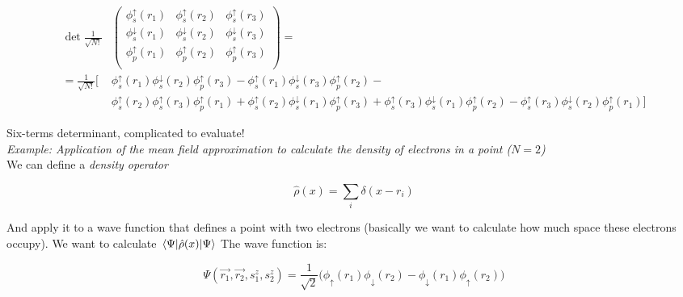 	\begin{align*}
		\det\frac{1}{\sqrt{N!}}&\begin{pmatrix}\phi_s^\uparrow(r_1)&\phi_s^\uparrow(r_2)&\phi_s^\uparrow(r_3)\\\phi_s^\downarrow(r_1)&\phi_s^\downarrow(r_2)&\phi_s^\downarrow(r_3)\\\phi_p^\uparrow(r_1)&\phi_p^\uparrow(r_2)&\phi_p^\uparrow(r_3)\\\end{pmatrix}=\\
		=\frac{1}{\sqrt{N!}}\big[&\phi_s^\uparrow(r_1)\phi_s^\downarrow(r_2)\phi_p^\uparrow(r_3)-\phi_s^\uparrow(r_1)\phi_s^\downarrow(r_3)\phi_p^\uparrow(r_2)-\\
		&\phi_s^\uparrow(r_2)\phi_s^\uparrow(r_3)\phi_p^\uparrow(r_1)+\phi_s^\uparrow(r_2)\phi_s^\downarrow(r_1)\phi_p^\uparrow(r_3)+\phi_s^\uparrow(r_3)\phi_s^\downarrow(r_1)\phi_p^\uparrow(r_2)-\phi_s^\uparrow(r_3)\phi_s^\downarrow(r_2)\phi_p^\uparrow(r_1)\big]
	\end{align*}

	Six-terms determinant, complicated to evaluate!\\
	\newline
	\textit{Example: Application of the mean field approximation to calculate the density of electrons in a point ($N=2$)}\\
	\newline
	We can define a \textit{density operator}

	$$\hat{\rho}(x)=\sum_i\delta(x-r_i)$$

	And apply it to a wave function that defines a point with two electrons (basically we want to calculate how much space these electrons occupy).
We want to calculate $\mel{\Psi}{\hat{\rho}(x)}{\Psi}$
	The wave function is:

	$$\Psi(\vec{r_1},\vec{r_2},s_1^z,s_2^z)=\frac{1}{\sqrt{2}}\big(\phi_\uparrow(r_1)\phi_\downarrow(r_2)-\phi_\downarrow(r_1)\phi_\uparrow(r_2)\big)$$


